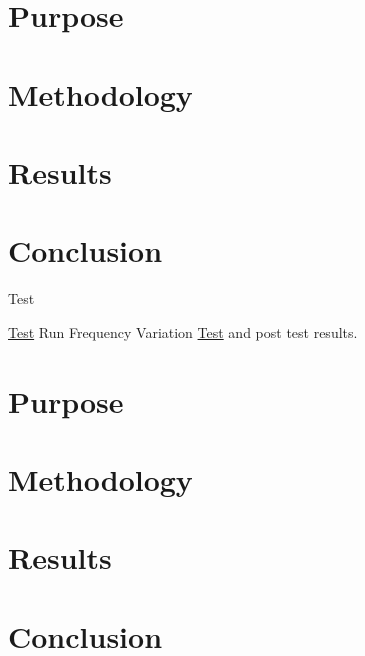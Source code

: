 \section*{Purpose}

\section*{Methodology}

\section*{Results}

\section*{Conclusion}

\begin{DoxyRefDesc}{Test}
\item[\hyperlink{test__test000018}{Test}]Run Frequency Variation \hyperlink{class_test}{Test} and post test results.\end{DoxyRefDesc}


\section*{Purpose}

\section*{Methodology}

\section*{Results}

\section*{Conclusion}